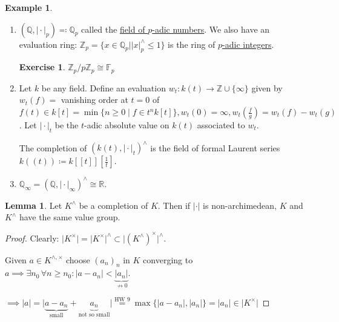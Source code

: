\documentclass[openany]{amsbook}
\numberwithin{section}{chapter}
\theoremstyle{definition}
\newtheorem*{example}{Example}
\newtheorem*{exercise}{Exercise}
\newtheorem{lemma}[theorem]{Lemma}
\begin{document}
\begin{example}
    \begin{enumerate}[label=\arabic*)]
        \item \((\mathbb{Q} , \vert \cdot \vert_p) \eqqcolon \mathbb{Q}_p\) called the \underline{field of \(p\)-adic numbers}. We also have an evaluation ring: \(\mathbb{Z}_p = \{ x\in \mathbb{Q}_p \mid \vert x \vert ^\wedge_p \leq 1 \} \) is the ring of \underline{\(p\)-adic integers}.
        
        \begin{exercise}
            \(\mathbb{Z}_p / p \mathbb{Z}_p \cong \mathbb{F}_p\)
        \end{exercise}

        \item Let \(k\) be any field. Define an evaluation \(w_t: k(t) \to \mathbb{Z} \cup \{ \infty \} \) given by \(w_t(f)=\) vanishing order at \(t=0\) of \(f(t)\in k[t] = \min\{ n \geq 0 \mid f\in t^n k[t] \}, w_t(0) = \infty, w_t \left( \frac{f}{g} \right) = w_t(f) - w_t(g)\). Let \(\vert \cdot \vert_t\) be the \(t\)-adic absolute value on \(k(t)\) associated to \(w_t\).
        
        The completion of \((k(t), \vert \cdot \vert _t)^\wedge\) is the field of formal Laurent series \(k((t)) \coloneqq k[[t]]\left[ \frac{1}{t} \right] \).
        
        \item \(\mathbb{Q}_\infty = (\mathbb{Q}, \vert \cdot \vert_\infty)^\wedge \cong \mathbb{R}\).
    \end{enumerate} 
\end{example}

\begin{lemma}
    Let \(K^\wedge\) be a completion of \(K\). Then if \(\vert \cdot \vert\) is non-archimedean, \(K\) and \(K^\wedge\) have the same value group.
\end{lemma}

\begin{proof}
    Clearly: \(\vert K^\times \vert = \vert K^\times \vert ^\wedge \subset \vert (K^{\wedge})^\times \vert^\wedge \).
    
    Given \(a\in K^{\wedge, \times}\) choose \((a_n)_n\) in \(K\) converging to \(a \implies \exists n_0\,\forall n \geq n_0 : \vert a - a_n \vert < \underbrace{\vert a_n \vert}_{\not\to 0}\).
    
    \(\implies \vert a \vert = \vert \underbrace{a - a_n}_{\text{small}} + \underbrace{a_n}_{\text{not so small}} \vert \overset{\text{HW 9}}{=} \max\{ \vert a - a_n \vert , \vert a_n \vert  \} = \vert a_n \vert \in \vert K^\times \vert\) 
\end{proof}
\end{document}
